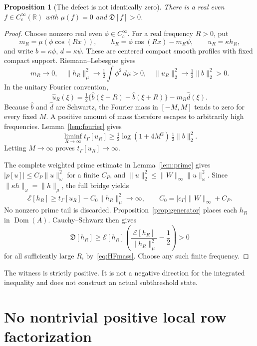 \documentclass[11pt,a4paper]{article}
\numberwithin{equation}{section}
\newtheorem{proposition}[theorem]{Proposition}
\theoremstyle{definition}
\theoremstyle{remark}
\newcommand{\R}{\mathbb R}
\newcommand{\E}{\mathcal E}
\newcommand{\tg}{t_{\Gamma}}
\newcommand{\cg}{c_{\Gamma}}
\newcommand{\dom}{\operatorname{Dom}}
\newcommand{\norm}[1]{\lVert #1\rVert}
\newcommand{\Def}{\mathfrak D}
\begin{document}
\begin{proposition}[The defect is not identically zero]\label{prop:positive}
There is a real even $f\in C_c^\infty(\R)$ with $\mu(f)=0$ and $\Def[f]>0$.
\end{proposition}
\begin{proof}
Choose nonzero real even $\phi\in C_c^\infty$. For a real frequency $R>0$, put
\[
 m_R=\mu(\phi\cos(Rx)),\qquad h_R=\phi\cos(Rx)-m_R\psi,
 \qquad u_R=\kappa h_R,
\]
and write $b=\kappa\phi$, $d=\kappa\psi$. These are centered compact smooth profiles with fixed compact support. Riemann--Lebesgue gives
\begin{equation}\label{eq:HFmass}
 m_R\to0,\quad
 \norm{h_R}_\mu^2\to\tfrac12\int\phi^2\,d\mu>0,\quad
 \norm{u_R}_2^2\to\tfrac12\norm b_2^2>0.
\end{equation}
In the unitary Fourier convention,
\[
 \widehat u_R(\xi)=\tfrac12\{\widehat b(\xi-R)+\widehat b(\xi+R)\}
                         -m_R\widehat d(\xi).
\]
Because $\widehat b$ and $\widehat d$ are Schwartz, the Fourier mass in $[-M,M]$ tends to zero for every fixed $M$. A positive amount of mass therefore escapes to arbitrarily high frequencies. Lemma~\ref{lem:fourier} gives
\[
 \liminf_{R\to\infty}\tg[u_R]
 \ge\tfrac12\log(1+4M^2)\,\tfrac12\norm b_2^2.
\]
Letting $M\to\infty$ proves $\tg[u_R]\to\infty$.

The complete weighted prime estimate in Lemma~\ref{lem:prime} gives
$|p[u]|\le C_P\norm u_\omega^2$ for a finite $C_P$, and
$\norm u_2^2\le\norm W_\infty\norm u_\omega^2$. Since $\norm{\kappa h}_\omega=\norm h_\mu$, the full bridge yields
\[
 \E[h_R]\ge\tg[u_R]-C_0\norm{h_R}_\mu^2\longrightarrow\infty,
 \qquad C_0=|\cg|\norm W_\infty+C_P.
\]
No nonzero prime tail is discarded. Proposition~\ref{prop:generator} places each $h_R$ in $\dom(A)$. Cauchy--Schwarz then gives
\[
 \Def[h_R]\ge\E[h_R]
       \left(\frac{\E[h_R]}{\norm{h_R}_\mu^2}-\frac12\right)>0
\]
for all sufficiently large $R$, by~\eqref{eq:HFmass}. Choose any such finite frequency.
\end{proof}

The witness is strictly positive. It is not a negative direction for the integrated inequality and does not construct an actual subthreshold state.

\section{No nontrivial positive local row factorization}\label{sec:nogo}
\end{document}
